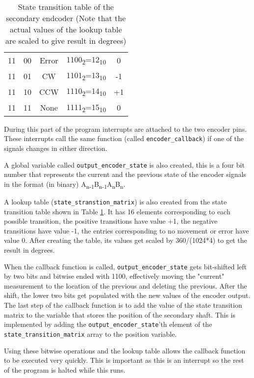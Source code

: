 \documentclass[12pt]{article}
\begin{document}
\begin{table}[h]
\begin{tabular}{|c|c|c|c|c|}
         11&00&Error&1100\textsubscript{2}=12\textsubscript{10}&0\\ 
         11&01&CW&1101\textsubscript{2}=13\textsubscript{10}&-1\\ 
         11&10&CCW&1110\textsubscript{2}=14\textsubscript{10}&+1\\ 
         11&11&None&1111\textsubscript{2}=15\textsubscript{10}&0\\ 
         \hline
    \end{tabular}
    \caption{State transition table of the secondary endcoder (Note that the actual values of the lookup table are scaled to give result in degrees)}
    \label{tab:output_encoder}
\end{table}

During this part of the program interrupts are attached to the two encoder pins. These interrupts call the same function (called \verb|encoder_callback|) if one of the signals changes in either direction.

A global variable called \verb|output_encoder_state| is also created, this is a four bit number that represents the current and the previous state of the encoder signals in the format (in binary) A\textsubscript{n-1}B\textsubscript{n-1}A\textsubscript{n}B\textsubscript{n}. 

A lookup table (\verb|state_stranstion_matrix|) is also created from the state transition table shown in Table \ref{tab:output_encoder}. It has 16 elements corresponding to each possible transition, the positive transitions have value +1, the negative transitions have value -1, the entries corresponding to no movement or error have value 0. After creating the table, its values get scaled by 360/(1024*4) to get the result in degrees.

When the callback function is called, \verb|output_encoder_state| gets bit-shifted left by two bits and bitwise ended with 1100, effectively moving the "current" measurement to the location of the previous and deleting the previous. After the shift, the lower two bits get populated with the new values of the encoder output. The last step of the callback function is to add the value of the state transition matrix to the variable that stores the position of the secondary shaft. This is implemented by adding the \verb|output_encoder_state|'th element of the \verb|state_transition_matrix| array to the position variable.

Using these bitwise operations and the lookup table allows the callback function to be executed very quickly. This is important as this is an interrupt so the rest of the program is halted while this runs.
\end{document}
